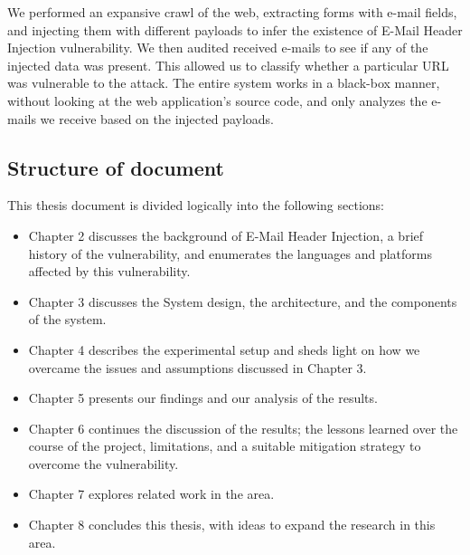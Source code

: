 	We performed an expansive crawl of the web, extracting forms with e-mail fields, and injecting them with different payloads to infer the existence of E-Mail Header Injection vulnerability. We then audited received e-mails to see if any of the injected data was present. This allowed us to classify whether a particular URL was vulnerable to the attack. The entire system works in a black-box manner, without looking at the web application's source code, and only analyzes the e-mails we receive based on the injected payloads.

\subsection*{Structure of document} %
This thesis document is divided logically into the following sections:
\begin{itemize}
	\item Chapter 2 discusses the background of E-Mail Header Injection, a brief history of the vulnerability, and enumerates the languages and platforms affected by this vulnerability.
	
	\item Chapter 3 discusses the System design, the architecture, and the components of the system.
	
	\item Chapter 4 describes the experimental setup and sheds light on how we overcame the issues and assumptions discussed in Chapter 3.
	
	\item Chapter 5 presents our findings and our analysis of the results.
	
	\item Chapter 6 continues the discussion of the results; the lessons learned over the course of the project, limitations, and a suitable mitigation strategy to overcome the vulnerability.
	
	\item Chapter 7 explores related work in the area.
	
	\item Chapter 8 concludes this thesis, with ideas to expand the research in this area.
\end{itemize} 

